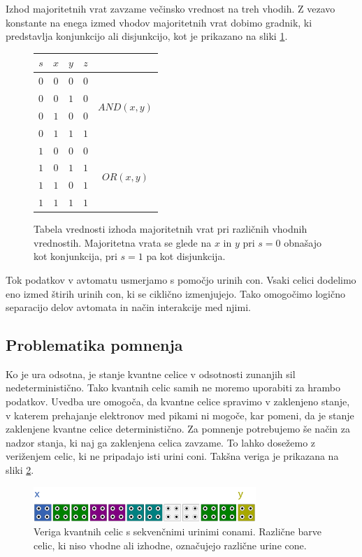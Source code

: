 \documentclass[a4paper, 11pt]{article}
\begin{document}
Izhod majoritetnih vrat zavzame večinsko vrednost na treh vhodih.
Z vezavo konstante na enega izmed vhodov majoritetnih vrat dobimo gradnik, ki predstavlja konjunkcijo ali disjunkcijo, kot je prikazano na sliki \ref{tab-pregled-major}.

\begin{figure}
	\centering
	\small
	\begin{tabular}{c|c|c||c c}
	$s$ & $x$ & $y$ & $z$ \\
	\hline
	$0$ & $0$ & $0$ & $0$ & \multirow{4}{*}{$AND(x, y)$} \\
	$0$ & $0$ & $1$ & $0$ \\
	$0$ & $1$ & $0$ & $0$ \\
	$0$ & $1$ & $1$ & $1$ \\
	\hline
	$1$ & $0$ & $0$ & $0$ & \multirow{4}{*}{$OR(x, y)$} \\
	$1$ & $0$ & $1$ & $1$ \\
	$1$ & $1$ & $0$ & $1$ \\
	$1$ & $1$ & $1$ & $1$ \\
	\end{tabular}
	\caption{Tabela vrednosti izhoda majoritetnih vrat pri različnih vhodnih vrednostih. Majoritetna vrata se glede na $x$ in $y$ pri $s = 0$ obnašajo kot konjunkcija, pri $s = 1$ pa kot disjunkcija.}
	\label{tab-pregled-major}
\end{figure}

Tok podatkov v avtomatu usmerjamo s pomočjo urinih con.
Vsaki celici dodelimo eno izmed štirih urinih con, ki se ciklično izmenjujejo.
Tako omogočimo logično separacijo delov avtomata in način interakcije med njimi.

\subsection{Problematika pomnenja}

Ko je ura odsotna, je stanje kvantne celice v odsotnosti zunanjih sil nedeterministično.
Tako kvantnih celic samih ne moremo uporabiti za hrambo podatkov.
Uvedba ure omogoča, da kvantne celice spravimo v zaklenjeno stanje, v katerem prehajanje elektronov med pikami ni mogoče, kar pomeni, da je stanje zaklenjene kvantne celice deterministično.
Za pomnenje potrebujemo še način za nadzor stanja, ki naj ga zaklenjena celica zavzame.
To lahko dosežemo z veriženjem celic, ki ne pripadajo isti urini coni.
Takšna veriga je prikazana na sliki \ref{img-pregled-seq-linear}.

\begin{figure}[h]
	\centering
	\includegraphics[width=0.75\textwidth]{../img/pregled/seq_linear.pdf}
	\caption{Veriga kvantnih celic s sekvenčnimi urinimi conami. Različne barve celic, ki niso vhodne ali izhodne, označujejo različne urine cone.}
	\label{img-pregled-seq-linear}
\end{figure}
\end{document}
